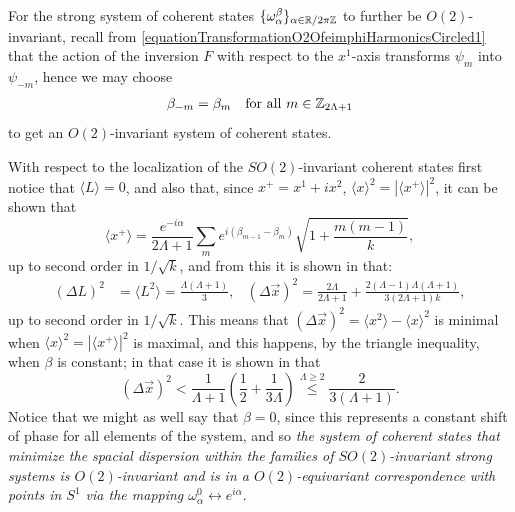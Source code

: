 For the strong system of coherent states $\{\omega^\beta_\alpha\}_{\alpha \in \mathbb{R}/2\pi\mathbb{Z}}$ to further be $O(2)$-invariant, recall from  \eqref{equationTransformationO2OfeimphiHarmonicsCircled1} that the action of the inversion $F$ with respect to the $x^1$-axis transforms $\psi_m$ into $\psi_{-m}$, hence we may choose
\begin{align}\label{equationConditionBetasO2Invariant}
    \beta_{-m} &= \beta_m & \text{for all } m \in \mathbb{Z}_{2\Lambda + 1}
\end{align}
to get an $O(2)$-invariant system of coherent states.

With respect to the localization of the $SO(2)$-invariant coherent states first notice that $\langle L \rangle = 0$, and also that, since $x^+ = x^1 + i x^2$, $\langle x\rangle ^2 = |\langle x^+ \rangle|^2$, it can be shown that 
\begin{equation*}
    \langle x^+ \rangle = \frac{e^{-i\alpha}}{2\Lambda + 1} \sum_{m} e^{i( \beta_{m-1} - \beta_m)} \sqrt{1 + \frac{m(m-1)}{k}},
\end{equation*} 
up to second order in $1/\sqrt{k}$, and from this it is shown in \cite{FioreCoherent2020} that:
\begin{align}\label{equationLocalizationAllStrongSystemsCoherentD2}
    (\Delta L)^2 &= \langle L^2 \rangle = \frac{\Lambda(\Lambda + 1)}{3},&
    (\Delta \vec x)^2 = \frac{2 \Lambda}{2 \Lambda + 1} + \frac{2(\Lambda - 1)\Lambda (\Lambda + 1)}{3(2\Lambda + 1)k},
\end{align}
up to second order in $1/\sqrt{k}$. This means that $(\Delta \vec x)^2 = \langle x^2 \rangle - \langle x \rangle ^2$ is minimal when $\langle x \rangle ^2 = |\langle x^+ \rangle |^2$ is maximal, and this happens, by the triangle inequality, when $\beta$ is constant; in that case it is shown in \cite{FioreCoherent2020} that
\begin{equation}
    (\Delta \vec x)^2 < \frac{1}{\Lambda + 1} \left( \frac{1}{2} + \frac{1}{3\Lambda} \right) \overset{\Lambda \geq 2}{\leq } \frac{2}{3(\Lambda + 1)}.
\end{equation}
Notice that we might as well say that $\beta = 0$, since this represents a constant shift of phase for all elements of the system, and so \textit{the system of coherent states that minimize the spacial dispersion within the families of $SO(2)$-invariant strong systems is $O(2)$-invariant and is in a $O(2)$-equivariant correspondence with points in $S^1$ via the mapping $\omega^0_\alpha \leftrightarrow e^{i \alpha}$}.

